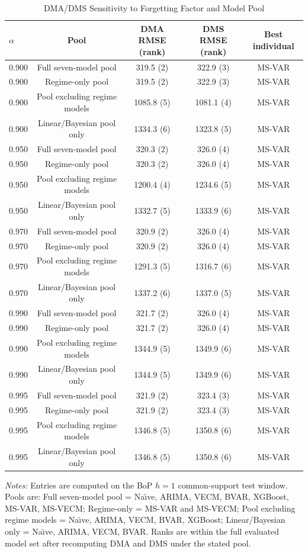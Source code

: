 \begin{table}[htbp]
\centering
\scriptsize
\caption{DMA/DMS Sensitivity to Forgetting Factor and Model Pool}
\label{tab:dma_dms_sensitivity}
\begin{tabular}{lcccc}
\toprule
$\alpha$ & Pool & DMA RMSE (rank) & DMS RMSE (rank) & Best individual \\
\midrule
0.900 & Full seven-model pool & 319.5 (2) & 322.9 (3) & MS-VAR \\
0.900 & Regime-only pool & 319.5 (2) & 322.9 (3) & MS-VAR \\
0.900 & Pool excluding regime models & 1085.8 (5) & 1081.1 (4) & MS-VAR \\
0.900 & Linear/Bayesian pool only & 1334.3 (6) & 1323.8 (5) & MS-VAR \\
0.950 & Full seven-model pool & 320.3 (2) & 326.0 (4) & MS-VAR \\
0.950 & Regime-only pool & 320.3 (2) & 326.0 (4) & MS-VAR \\
0.950 & Pool excluding regime models & 1200.4 (4) & 1234.6 (5) & MS-VAR \\
0.950 & Linear/Bayesian pool only & 1332.7 (5) & 1333.9 (6) & MS-VAR \\
0.970 & Full seven-model pool & 320.9 (2) & 326.0 (4) & MS-VAR \\
0.970 & Regime-only pool & 320.9 (2) & 326.0 (4) & MS-VAR \\
0.970 & Pool excluding regime models & 1291.3 (5) & 1316.7 (6) & MS-VAR \\
0.970 & Linear/Bayesian pool only & 1337.2 (6) & 1337.0 (5) & MS-VAR \\
0.990 & Full seven-model pool & 321.7 (2) & 326.0 (4) & MS-VAR \\
0.990 & Regime-only pool & 321.7 (2) & 326.0 (4) & MS-VAR \\
0.990 & Pool excluding regime models & 1344.9 (5) & 1349.9 (6) & MS-VAR \\
0.990 & Linear/Bayesian pool only & 1344.9 (5) & 1349.9 (6) & MS-VAR \\
0.995 & Full seven-model pool & 321.9 (2) & 323.4 (3) & MS-VAR \\
0.995 & Regime-only pool & 321.9 (2) & 323.4 (3) & MS-VAR \\
0.995 & Pool excluding regime models & 1346.8 (5) & 1350.8 (6) & MS-VAR \\
0.995 & Linear/Bayesian pool only & 1346.8 (5) & 1350.8 (6) & MS-VAR \\
\bottomrule
\end{tabular}
\begin{tablenotes}
\footnotesize
\item \textit{Notes:} Entries are computed on the BoP $h=1$ common-support test window. Pools are: Full seven-model pool = Na\"{\i}ve, ARIMA, VECM, BVAR, XGBoost, MS-VAR, MS-VECM; Regime-only = MS-VAR and MS-VECM; Pool excluding regime models = Na\"{\i}ve, ARIMA, VECM, BVAR, XGBoost; Linear/Bayesian only = Na\"{\i}ve, ARIMA, VECM, BVAR. Ranks are within the full evaluated model set after recomputing DMA and DMS under the stated pool.
\end{tablenotes}
\end{table}